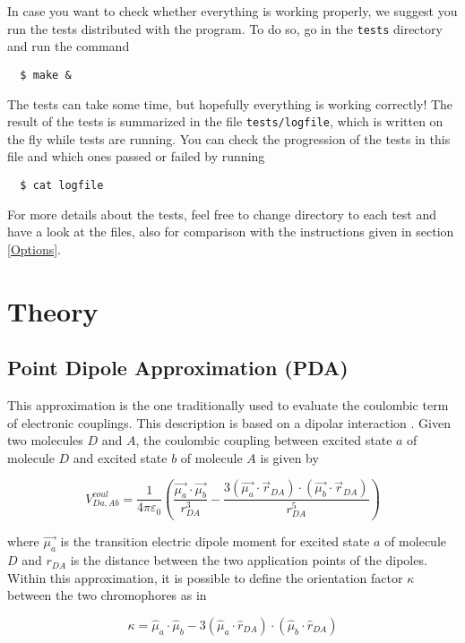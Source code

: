 \documentclass[a4paper]{article}
\begin{document}
In case you want to check whether everything is working properly, we suggest you run the tests distributed with the program.
To do so, go in the \verb|tests| directory and run the command

\begin{verbatim}
  $ make &
\end{verbatim}

The tests can take some time, but hopefully everything is working correctly! The result of the tests is summarized in the file \verb|tests/logfile|, which is written on the fly while tests are running. You can check the progression of the tests in this file and which ones passed or failed by running

\begin{verbatim}
  $ cat logfile
\end{verbatim}

For more details about the tests, feel free to change directory to each test and have a look at the files, also for comparison with the instructions given in section \ref{Options}.

\section{Theory}
\subsection*{Point Dipole Approximation (PDA)}
This approximation is the one traditionally used to evaluate the coulombic term of electronic couplings. This description is based on a dipolar interaction \cite{PDA}.  Given two molecules $D$ and $A$, the coulombic coupling between excited state $a$ of molecule $D$ and excited state $b$ of molecule $A$ is given by

\begin{equation}
 V^{coul}_{Da,Ab} = \frac{1}{4\pi\varepsilon_0} \left( \frac{\vec{\mu_a}\cdot\vec{\mu_b}}{r_{DA}^3} - \frac{3(\vec{\mu_a}\cdot \vec{r}_{DA})\cdot(\vec{\mu_b}\cdot\vec{r}_{DA})}{r_{DA}^5} \right)
 \label{eq:PDA}
\end{equation}

where $\vec{\mu_a}$ is the transition electric dipole moment for excited state $a$ of molecule $D$ and $r_{DA}$ is the distance between the two application points of the dipoles. Within this approximation, it is possible to define the orientation factor $\kappa$ between the two chromophores as in

\begin{equation}
 \kappa = \hat{\mu}_a\cdot\hat{\mu}_b - 3(\hat{\mu}_a\cdot \hat{r}_{DA})\cdot(\hat{\mu}_b\cdot\hat{r}_{DA})
 \label{eq:orifac}
\end{equation}
\end{document}
